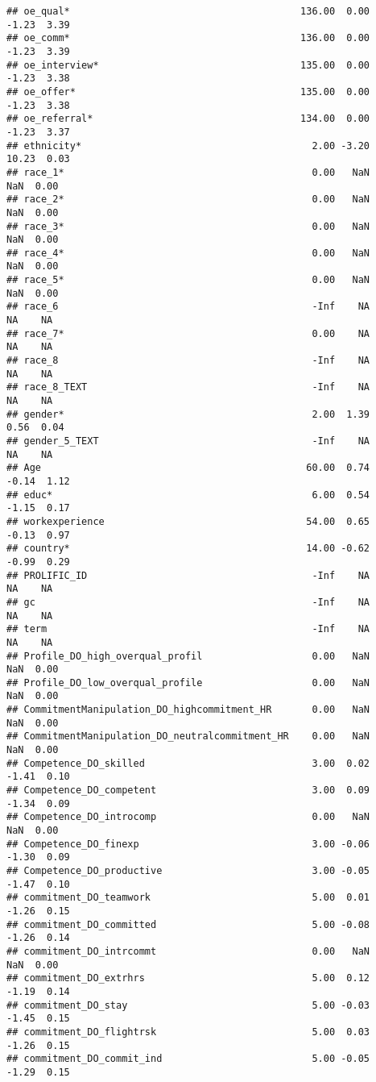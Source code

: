 \documentclass[]{article}
\begin{document}
\begin{verbatim}
## oe_qual*                                        136.00  0.00    -1.23  3.39
## oe_comm*                                        136.00  0.00    -1.23  3.39
## oe_interview*                                   135.00  0.00    -1.23  3.38
## oe_offer*                                       135.00  0.00    -1.23  3.38
## oe_referral*                                    134.00  0.00    -1.23  3.37
## ethnicity*                                        2.00 -3.20    10.23  0.03
## race_1*                                           0.00   NaN      NaN  0.00
## race_2*                                           0.00   NaN      NaN  0.00
## race_3*                                           0.00   NaN      NaN  0.00
## race_4*                                           0.00   NaN      NaN  0.00
## race_5*                                           0.00   NaN      NaN  0.00
## race_6                                            -Inf    NA       NA    NA
## race_7*                                           0.00    NA       NA    NA
## race_8                                            -Inf    NA       NA    NA
## race_8_TEXT                                       -Inf    NA       NA    NA
## gender*                                           2.00  1.39     0.56  0.04
## gender_5_TEXT                                     -Inf    NA       NA    NA
## Age                                              60.00  0.74    -0.14  1.12
## educ*                                             6.00  0.54    -1.15  0.17
## workexperience                                   54.00  0.65    -0.13  0.97
## country*                                         14.00 -0.62    -0.99  0.29
## PROLIFIC_ID                                       -Inf    NA       NA    NA
## gc                                                -Inf    NA       NA    NA
## term                                              -Inf    NA       NA    NA
## Profile_DO_high_overqual_profil                   0.00   NaN      NaN  0.00
## Profile_DO_low_overqual_profile                   0.00   NaN      NaN  0.00
## CommitmentManipulation_DO_highcommitment_HR       0.00   NaN      NaN  0.00
## CommitmentManipulation_DO_neutralcommitment_HR    0.00   NaN      NaN  0.00
## Competence_DO_skilled                             3.00  0.02    -1.41  0.10
## Competence_DO_competent                           3.00  0.09    -1.34  0.09
## Competence_DO_introcomp                           0.00   NaN      NaN  0.00
## Competence_DO_finexp                              3.00 -0.06    -1.30  0.09
## Competence_DO_productive                          3.00 -0.05    -1.47  0.10
## commitment_DO_teamwork                            5.00  0.01    -1.26  0.15
## commitment_DO_committed                           5.00 -0.08    -1.26  0.14
## commitment_DO_intrcommt                           0.00   NaN      NaN  0.00
## commitment_DO_extrhrs                             5.00  0.12    -1.19  0.14
## commitment_DO_stay                                5.00 -0.03    -1.45  0.15
## commitment_DO_flightrsk                           5.00  0.03    -1.26  0.15
## commitment_DO_commit_ind                          5.00 -0.05    -1.29  0.15
\end{verbatim}
\end{document}
